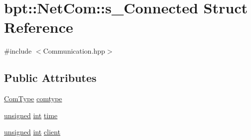 \hypertarget{structbpt_1_1_net_com_1_1s___connected}{\section{bpt\-:\-:Net\-Com\-:\-:s\-\_\-\-Connected Struct Reference}
\label{structbpt_1_1_net_com_1_1s___connected}
}


{\ttfamily \#include $<$Communication.\-hpp$>$}

\subsection*{Public Attributes}
\begin{DoxyCompactItemize}
\item 
\hyperlink{namespacebpt_1_1_net_com_a73b47b2b099bf7d28997dc72c921212c}{Com\-Type} \hyperlink{structbpt_1_1_net_com_1_1s___connected_a8b46edb6918e04e2ace361e9bc9654b0}{comtype}
\item 
\hyperlink{curses_8priv_8h_aca40206900cfc164654362fa8d4ad1e6}{unsigned} \hyperlink{term__entry_8h_ad65b480f8c8270356b45a9890f6499ae}{int} \hyperlink{structbpt_1_1_net_com_1_1s___connected_a66ac8237357f9ba3d21a70b7fe3a4586}{time}
\item 
\hyperlink{curses_8priv_8h_aca40206900cfc164654362fa8d4ad1e6}{unsigned} \hyperlink{term__entry_8h_ad65b480f8c8270356b45a9890f6499ae}{int} \hyperlink{structbpt_1_1_net_com_1_1s___connected_a7f4b317b9d3e6018faef1d4a3c7abce7}{client}
\end{DoxyCompactItemize}


